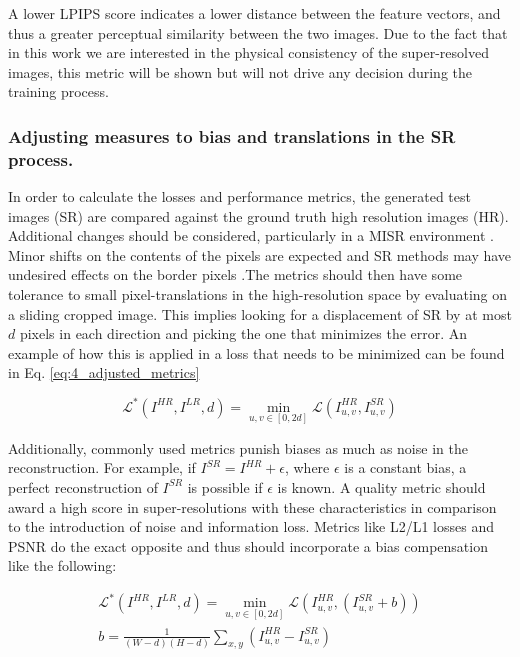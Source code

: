         A lower LPIPS score indicates a lower distance between the feature vectors, and thus a greater perceptual similarity between the two images. 
        Due to the fact that in this work we are interested in the physical consistency of the super-resolved images, 
        this metric will be shown but will not drive any decision during the training process.
        

        \subsubsection{Adjusting measures to bias and translations in the SR process.}
    
            In order to calculate the losses and performance metrics, the generated test images (SR) are compared against the ground truth high resolution images (HR).
            Additional changes should be considered, particularly in a MISR environment \cite{martens2019superresolution}.
            Minor shifts on the contents of the pixels are expected and  SR methods may have undesired effects on the border pixels .The metrics should then have some tolerance to small pixel-translations in the high-resolution space by evaluating on a sliding cropped image. 
            This implies looking for a displacement of SR by at most $d$ pixels in each direction and picking the one that minimizes the error. 
            An example of how this is applied in a loss that needs to be minimized can be found in Eq. \ref{eq:4_adjusted_metrics}
    
            \begin{equation}
               \mathcal{L}^* ( I^{HR}, I^{LR}, d) = \min_{u,v \in [0,2d]} \mathcal{L} ( I^{HR}_{u,v}, I^{SR}_{u,v})
            \label{eq:4_adjusted_metrics}
            \end{equation}
    
            Additionally, commonly used metrics punish biases as much as noise in the reconstruction.
            For example, if $I^{SR} = I^{HR} + \epsilon$, where $\epsilon$ is a constant bias, a perfect reconstruction of $I^{SR}$ is possible if $\epsilon$ is known. 
            A quality metric should award a high score in super-resolutions with these characteristics in comparison to the introduction of noise and information loss. Metrics like L2/L1 losses and PSNR do the exact opposite and thus should incorporate a bias compensation like the following: 
    
            \begin{equation}
                \begin{aligned}
                    \mathcal{L}^* ( I^{HR}, I^{LR}, d) = \min_{u,v \in [0,2d]} \mathcal{L} ( I^{HR}_{u,v}, (I^{SR}_{u,v}+b)) \\
                    b = \frac{1}{(W - d)(H - d)} \sum_{x,y} \left( I^{HR}_{u,v} - I^{SR}_{u,v} \right)
               \end{aligned}
            \end{equation}
    
